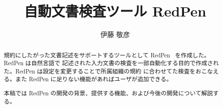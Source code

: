 \documentclass[a4paper, 10pt]{jarticle}
\title{自動文書検査ツール RedPen}
\author{伊藤 敬彦}
\begin{document}
\maketitle
\begin{abstract}
規約にしたがった文書記述をサポートするツールとして RedPen~\cite{redpen} を作成した。RedPen は自然言語で
記述された入力文書の検査を一部自動化する目的で作成された。RedPen は設定を変更することで所属組織の規約
に合わせてた検査をおこなえる。また RedPen に足りない機能があればユーザが追加できる。

本稿では RedPen の開発の背景、提供する機能、および今後の開発について解説する。
\end{abstract}





\end{document}
